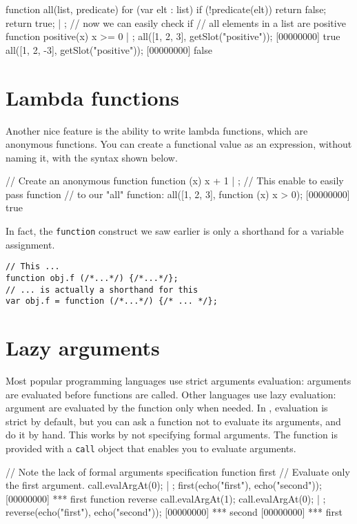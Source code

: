 \begin{urbiscript}
function all(list, predicate)
{
  for (var elt : list)
    if (!predicate(elt))
      return false;
  return true;
} | {};
// now we can easily check if
// all elements in a list are positive
function positive(x) { x >= 0 } | {};
all([1, 2, 3], getSlot("positive"));
[00000000] true
all([1, 2, -3], getSlot("positive"));
[00000000] false
\end{urbiscript}

\section{Lambda functions}

Another nice feature is the ability to write lambda functions, which
are anonymous functions. You can create a functional value as an
expression, without naming it, with the syntax shown below.

\begin{urbiscript}
// Create an anonymous function
function (x) {x + 1} | {};
// This enable to easily pass function
// to our "all" function:
all([1, 2, 3], function (x) { x > 0});
[00000000] true
\end{urbiscript}

In fact, the \lstinline{function} construct we saw earlier is only a
shorthand for a variable assignment.

\begin{lstlisting}
// This ...
function obj.f (/*...*/) {/*...*/};
// ... is actually a shorthand for this
var obj.f = function (/*...*/) {/* ... */};
\end{lstlisting}

\section{Lazy arguments}

Most popular programming languages use strict arguments evaluation:
arguments are evaluated before functions are called. Other languages
use lazy evaluation: argument are evaluated by the function only when
needed. In \us, evaluation is strict by default, but you can ask a
function not to evaluate its arguments, and do it by hand. This works
by not specifying formal arguments. The function is provided with a
\lstinline{call} object that enables you to evaluate arguments.

\begin{urbiscript}
// Note the lack of formal arguments specification
function first
{
  // Evaluate only the first argument.
  call.evalArgAt(0);
} | {};
first(echo("first"), echo("second"));
[00000000] *** first
function reverse
{
  call.evalArgAt(1);
  call.evalArgAt(0);
} | {};
reverse(echo("first"), echo("second"));
[00000000] *** second
[00000000] *** first
\end{urbiscript}

